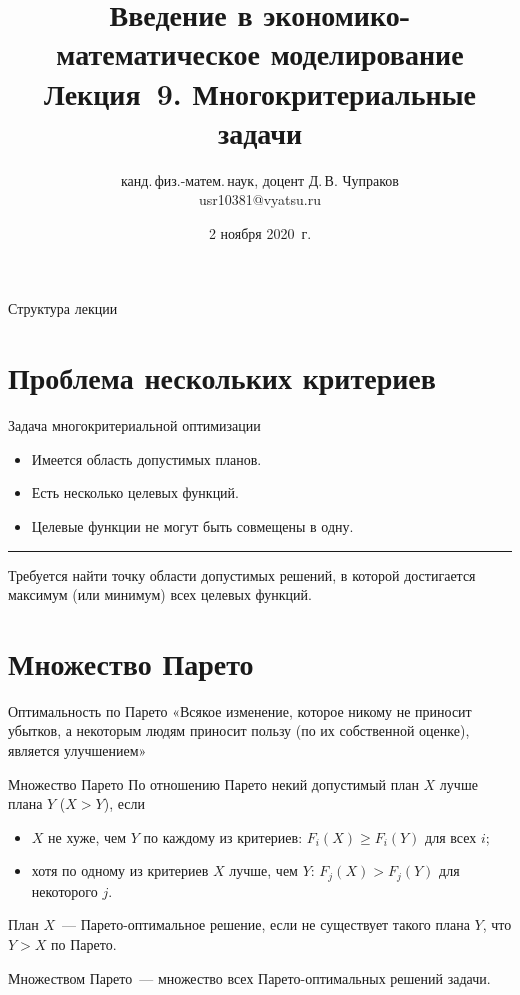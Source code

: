 \documentclass[unicode,11pt,notheorems,xcolor=table]{beamer}
\author[Д.\,В. Чупраков]{канд.\,физ.-матем.\,наук, доцент Д.\,В. Чупраков\\[6pt] usr10381@vyatsu.ru}
\institute[ВятГУ]{ФГБОУ ВО Вятский государственный университет}
\title[Лекция~9. Многокритериальные задачи]{
	Введение в экономико-математическое моделирование\\[12pt]
	Лекция~9. Многокритериальные задачи}
\date{2 ноября 2020~г.}
\begin{document}
\maketitle

\begin{frame}{Структура лекции}
	\tableofcontents
\end{frame}

\section{Проблема нескольких критериев}
\begin{frame}{Задача многокритериальной оптимизации}
    \begin{itemize}
        \item Имеется область допустимых планов.
        \item Есть несколько целевых функций.
        \item Целевые функции не могут быть совмещены в одну.
    \end{itemize}
    \medskip
    \hrule
    \medskip
    Требуется найти точку области допустимых решений, в которой достигается максимум (или минимум) всех целевых функций. 
\end{frame}
\section{Множество Парето}
\begin{frame}{Оптимальность по Парето}
    \alert{«Всякое изменение, которое никому не приносит убытков, а некоторым людям приносит пользу (по их собственной оценке), является улучшением»}
\end{frame}

\begin{frame}{Множество Парето}
    По отношению Парето некий допустимый \alert{план $X$ лучше плана $Y$} ($X > Y$), если 
    \begin{itemize}
        \item $X$ не хуже, чем $Y$ по каждому из критериев: \alert{$F_i(X) \geqslant F_i(Y)$ для всех $i$};
        \item хотя по одному из критериев $X$ лучше, чем $Y$: \alert{$F_j(X) > F_j(Y)$ для некоторого  $j$}.
    \end{itemize}


    План $X$~--- \alert{Парето-оптимальное решение}, если не существует такого плана $Y$, что $Y > X$ по Парето.

    \alert{Множеством Парето}~--- множество  всех Парето-оптимальных решений задачи.
\end{frame}
\end{document}
